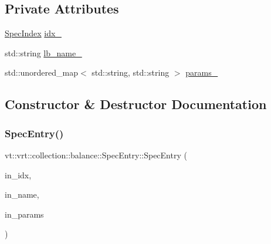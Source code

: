 \subsection*{Private Attributes}
\begin{DoxyCompactItemize}
\item 
\hyperlink{namespacevt_1_1vrt_1_1collection_1_1balance_a72a5e0d9936ddf57f8e6c64e0e9fd123}{Spec\+Index} \hyperlink{structvt_1_1vrt_1_1collection_1_1balance_1_1_spec_entry_ab76105257ea98781af7e039dba9cb63b}{idx\+\_\+}
\item 
std\+::string \hyperlink{structvt_1_1vrt_1_1collection_1_1balance_1_1_spec_entry_ad163d019f9d92288f78026d95a55e175}{lb\+\_\+name\+\_\+}
\item 
std\+::unordered\+\_\+map$<$ std\+::string, std\+::string $>$ \hyperlink{structvt_1_1vrt_1_1collection_1_1balance_1_1_spec_entry_ad96a32192f3e2b7cb3502350e21a7cac}{params\+\_\+}
\end{DoxyCompactItemize}


\subsection{Constructor \& Destructor Documentation}
\mbox{\label{structvt_1_1vrt_1_1collection_1_1balance_1_1_spec_entry_a69de4799079a46b5af62eccf974b7eef}} 
\subsubsection{\texorpdfstring{Spec\+Entry()}{SpecEntry()}}
{\footnotesize\ttfamily vt\+::vrt\+::collection\+::balance\+::\+Spec\+Entry\+::\+Spec\+Entry (\begin{DoxyParamCaption}\item[{\hyperlink{namespacevt_1_1vrt_1_1collection_1_1balance_a72a5e0d9936ddf57f8e6c64e0e9fd123}{Spec\+Index} const}]{in\+\_\+idx,  }\item[{std\+::string const}]{in\+\_\+name,  }\item[{std\+::unordered\+\_\+map$<$ std\+::string, std\+::string $>$}]{in\+\_\+params }\end{DoxyParamCaption})\hspace{0.3cm}{\ttfamily [inline]}}



